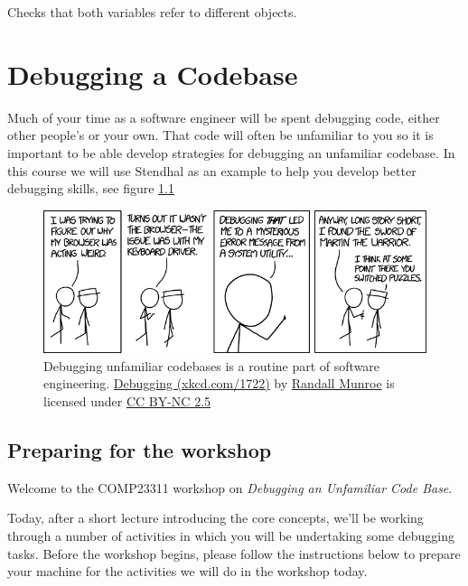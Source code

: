 \documentclass[
]{book}
\begin{document}
Checks that both variables refer to different objects.

\hypertarget{debugging}{%
\chapter{Debugging a Codebase}\label{debugging}}

Much of your time as a software engineer will be spent debugging code, either other people's or your own. That code will often be unfamiliar to you so it is important to be able develop strategies for debugging an unfamiliar codebase. In this course we will use Stendhal as an example to help you develop better debugging skills, see figure \ref{fig:xkcd-debugging-fig}

\begin{figure}

{\centering \includegraphics[width=0.99\linewidth]{images/debugging} 

}

\caption{Debugging unfamiliar codebases is a routine part of software engineering. \href{https://xkcd.com/1722/}{Debugging (xkcd.com/1722)} by \href{https://en.wikipedia.org/wiki/Randall_Munroe}{Randall Munroe} is licensed under \href{https://creativecommons.org/licenses/by-nc/2.5/}{CC BY-NC 2.5}}\label{fig:xkcd-debugging-fig}
\end{figure}



\hypertarget{preparing-for-the-workshop}{%
\section{Preparing for the workshop}\label{preparing-for-the-workshop}}

Welcome to the COMP23311 workshop on \emph{Debugging an Unfamiliar Code Base}.

Today, after a short lecture introducing the core concepts, we'll be working through a number of activities in which you will be undertaking some debugging tasks. Before the workshop begins, please follow the instructions below to prepare your machine for the activities we will do in the workshop today.
\end{document}
